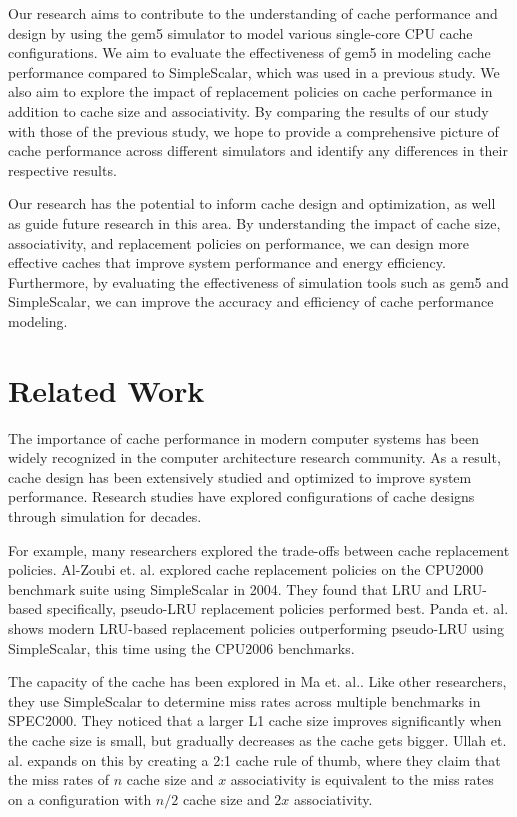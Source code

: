 \documentclass[conference]{IEEEtran}
\begin{document}
Our research aims to contribute to the understanding of cache performance and design by using the gem5 simulator to model various single-core CPU cache configurations. We aim to evaluate the effectiveness of gem5 in modeling cache performance compared to SimpleScalar, which was used in a previous study. We also aim to explore the impact of replacement policies on cache performance in addition to cache size and associativity. By comparing the results of our study with those of the previous study, we hope to provide a comprehensive picture of cache performance across different simulators and identify any differences in their respective results.

Our research has the potential to inform cache design and optimization, as well as guide future research in this area. By understanding the impact of cache size, associativity, and replacement policies on performance, we can design more effective caches that improve system performance and energy efficiency. Furthermore, by evaluating the effectiveness of simulation tools such as gem5 and SimpleScalar, we can improve the accuracy and efficiency of cache performance modeling.

\section{Related Work}

The importance of cache performance in modern computer systems has been widely recognized in the computer architecture research community. As a result, cache design has been extensively studied and optimized to improve system performance. Research studies have explored configurations of cache designs through simulation for decades.

For example, many researchers explored the trade-offs between cache replacement policies. Al-Zoubi et. al.\cite{10.1145/986537.986601} explored cache replacement policies on the CPU2000 benchmark suite using SimpleScalar in 2004. They found that LRU and LRU-based specifically, pseudo-LRU replacement policies performed best. Panda et. al.\cite{7806218} shows modern LRU-based replacement policies outperforming pseudo-LRU using SimpleScalar, this time using the CPU2006 benchmarks.

The capacity of the cache has been explored in Ma et. al.\cite{5260945}. Like other researchers, they use SimpleScalar to determine miss rates across multiple benchmarks in SPEC2000. They noticed that a larger L1 cache size improves significantly when the cache size is small, but gradually decreases as the cache gets bigger. Ullah et. al.\cite{8975563} expands on this by creating a 2:1 cache rule of thumb, where they claim that the miss rates of $n$ cache size and $x$ associativity is equivalent to the miss rates on a configuration with $n/2$ cache size and $2x$ associativity.
\end{document}
